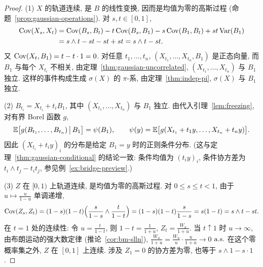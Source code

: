 \begin{proof}
(1) $X$ 的轨道连续, 是 $B$ 的线性变换, 因而是均值为零的高斯过程 (命题~\ref{prop:gaussian-operations}). 对 $s,t\in[0,1]$,
\begin{align*}
\operatorname{Cov}(X_s,X_t)&=\operatorname{Cov}(B_s,B_t)-t\operatorname{Cov}(B_s,B_1)-s\operatorname{Cov}(B_1,B_t)+st\operatorname{Var}(B_1)\\
&=s\wedge t-st-st+st=s\wedge t-st.
\end{align*}
又 $\operatorname{Cov}(X_t,B_1)=t-t\cdot1=0$. 对任意 $t_1,\dots,t_n$, $(X_{t_1},\dots,X_{t_n},B_1)$ 是正态向量, 而 $B_1$ 与每个 $X_{t_i}$ 不相关, 由定理~\ref{thm:gaussian-uncorrelated}, $(X_{t_1},\dots,X_{t_n})$ 与 $B_1$ 独立. 这样的事件构成生成 $\sigma(X)$ 的 $\pi$-系, 由定理~\ref{thm:indep-pi}, $\sigma(X)$ 与 $B_1$ 独立.

(2) $B_{t_i}=X_{t_i}+t_iB_1$, 其中 $(X_{t_1},\dots,X_{t_n})$ 与 $B_1$ 独立. 由代入引理~\ref{lem:freezing}, 对有界 Borel 函数 $g$,
\[
\mathbb{E}\big[g(B_{t_1},\dots,B_{t_n})\,\big|\,B_1\big]=\psi(B_1),\qquad\psi(y)=\mathbb{E}\big[g(X_{t_1}+t_1y,\dots,X_{t_n}+t_ny)\big].
\]
因此 $(X_{t_i}+t_iy)_i$ 的分布是给定 $B_1=y$ 时的正则条件分布. (这与定理~\ref{thm:gaussian-conditional} 的结论一致: 条件均值为 $(t_iy)_i$, 条件协方差为 $t_i\wedge t_j-t_it_j$, 参见例~\ref{ex:bridge-preview}.)

(3) $Z$ 在 $[0,1)$ 上轨道连续, 是均值为零的高斯过程. 对 $0\le s\le t<1$, 由于 $u\mapsto\frac{u}{1-u}$ 单调递增,
\[
\operatorname{Cov}(Z_s,Z_t)=(1-s)(1-t)\Big(\frac{s}{1-s}\wedge\frac{t}{1-t}\Big)=(1-s)(1-t)\frac{s}{1-s}=s(1-t)=s\wedge t-st.
\]
在 $t=1$ 处的连续性: 令 $u=\frac{t}{1-t}$, 则 $1-t=\frac{1}{1+u}$, $Z_t=\frac{W_u}{1+u}$. 当 $t\uparrow1$ 时 $u\to\infty$, 由布朗运动的强大数定律 (推论~\ref{cor:bm-slln}), $\frac{W_u}{1+u}=\frac{W_u}{u}\cdot\frac{u}{1+u}\to0$ $\text{a.s.}$ 在这个零概率集之外, $Z$ 在 $[0,1]$ 上连续. 涉及 $Z_1=0$ 的协方差为零, 也等于 $s\wedge1-s\cdot1$.
\end{proof}

